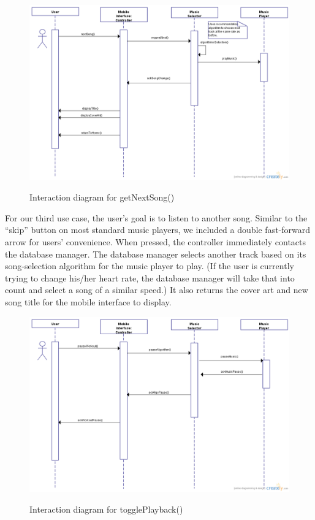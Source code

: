 \documentclass[letterpaper,english, 12pt]{scrreprt}
\begin{document}
\begin{figure}[H]
	\centering
	\includegraphics[scale=.40]{img/Interaction_Diagrams/newUC3.png}\\
	\caption {Interaction diagram for getNextSong()} 
\end{figure}

For our third use case, the user's goal is to listen to another song. Similar to the ``skip'' button on most standard music players, we included a double fast-forward arrow for users' convenience. When pressed, the controller immediately contacts the database manager. The database manager selects another track based on its song-selection algorithm for the music player to play. (If the user is currently trying to change his/her heart rate, the database manager will take that into count and select a song of a similar speed.) It also returns the cover art and new song title for the mobile interface to display.

\begin{figure}[H]
	\includegraphics[scale=.40]{img/Interaction_Diagrams/newUC4.png}\\
	\caption {Interaction diagram for togglePlayback()} 
\end{figure}
\end{document}
